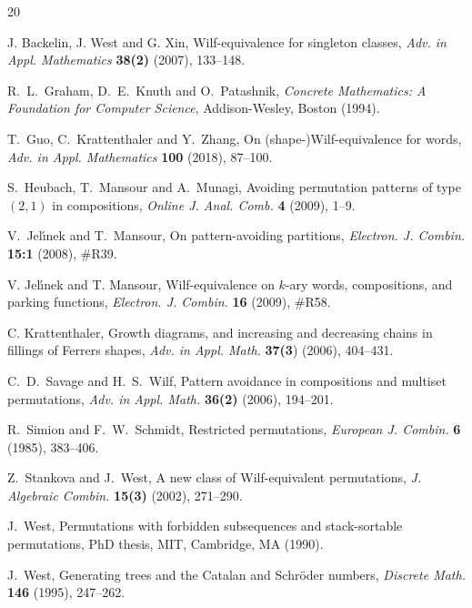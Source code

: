 \documentclass[11pt]{amsart}
\theoremstyle{plain}
\theoremstyle{definition}
\begin{document}
\begin{thebibliography}{20}

 J. Backelin, J. West and G. Xin,  Wilf-equivalence for singleton classes,
\emph{Adv. in Appl. Mathematics} \textbf{38(2)} (2007), 133--148.

 R.~L.~Graham, D.~E.~Knuth and O.~Patashnik, \emph{Concrete Mathematics: A Foundation
for Computer Science}, Addison-Wesley, Boston (1994).

 T.~Guo, C.~Krattenthaler and Y.~Zhang, On (shape-)Wilf-equivalence for words,
\emph{Adv. in Appl. Mathematics} \textbf{100} (2018), 87--100.

 S.~Heubach, T.~Mansour and A.~Munagi, Avoiding permutation patterns of type $(2, 1)$
in compositions, \emph{Online J. Anal. Comb.} \textbf{4} (2009), 1--9.

 V.~Jel\'\i nek and T.~Mansour, On pattern-avoiding partitions, {\em Electron. J.
Combin.} {\bf 15:1} (2008), \#R39.

 V. Jel\'\i nek and T. Mansour, Wilf-equivalence on $k$-ary words, compositions, and
parking functions, \emph{Electron. J. Combin.} \textbf{16} (2009), \#R58.

 C. Krattenthaler, Growth diagrams, and increasing and decreasing chains in fillings of Ferrers shapes, \emph{Adv. in  Appl. Math.} \textbf{37(3}) (2006), 404--431.

 C.~D.~Savage and H.~S.~Wilf, Pattern avoidance in compositions and multiset permutations, {\em Adv. in Appl. Math.} \textbf{36(2)} (2006), 194--201.

 R.~Simion and F.~W.~Schmidt,  Restricted permutations, {\em European J. Combin.} \textbf{6} (1985), 383--406.

 Z.~Stankova and J.~West, A new class of {W}ilf-equivalent permutations, \emph{J.
Algebraic Combin.} \textbf{15(3)} (2002), {271--290}.

 J.~West, Permutations with forbidden subsequences and stack-sortable permutations, PhD thesis, MIT, Cambridge, MA (1990).

 J.~West, Generating trees and the Catalan and Schr\"{o}der numbers, \emph{Discrete
Math.} \textbf{146} (1995),  247--262.

\end{thebibliography}
\end{document}

